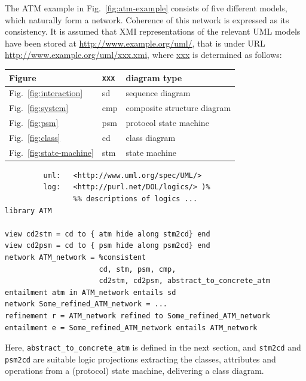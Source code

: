 \documentclass[10pt,fleqn,final]{scrreprt}
\newcommand{\cbs}[0]{\color{red}\xspace} %
\newcommand{\cbe}[0]{\color{black}\xspace} %
\newenvironment{definitions}[0]{\medskip }{}
\begin{document}
\begin{definitions}
The ATM example in Fig.~\ref{fig:atm-example} consists of five different
models, which naturally form a network. Coherence of this network
is expressed as its consistency.\cbs 
It is assumed that XMI representations\cbe of the
relevant UML models have been stored at
\url{http://www.example.org/uml/}, that is under URL
\url{http://www.example.org/uml/xxx.xmi}, where \url{xxx} is
determined as follows:\medskip

\begin{tabular}{|l|l|l|}\hline
\textbf{Figure} & \textbf{\texttt{xxx}} & \textbf{diagram type}\\\hline
Fig.~\ref{fig:interaction} & sd & sequence diagram\\\hline
Fig.~\ref{fig:system} & cmp & composite structure diagram\\\hline
Fig.~\ref{fig:psm} & psm & protocol state machine\\\hline
Fig.~\ref{fig:class} & cd & class diagram\\\hline
Fig.~\ref{fig:state-machine} & stm & state machine\\\hline
\end{tabular}

\begin{lstlisting}[basicstyle=\ttfamily,language=dolText,morekeywords={props,ObjectProperty,Class,DisjointUnionOf,SubClassOf,Characteristics,Transitive,Asymmetric,SubPropertyOf,DisjointClasses,EquivalentTo,inverse,only,forall,iff,if,or,exists,distributed,refinement,library,via,network,entailment,entails,refined,consistent},escapechar=@,mathescape]
%prefix( :      <http://www.example.org/uml/>
         uml:   <http://www.uml.org/spec/UML/>
         log:   <http://purl.net/DOL/logics/> )%
                %% descriptions of logics ...
library ATM

view cd2stm = cd to { atm hide along stm2cd} end
view cd2psm = cd to { psm hide along psm2cd} end
network ATM_network = %consistent
                      cd, stm, psm, cmp,
                      cd2stm, cd2psm, abstract_to_concrete_atm
entailment atm in ATM_network entails sd
network Some_refined_ATM_network = ...
refinement r = ATM_network refined to Some_refined_ATM_network
entailment e = Some_refined_ATM_network entails ATM_network
\end{lstlisting}
Here, \texttt{abstract\_to\_concrete\_atm} is defined in the next
section, and \texttt{stm2cd} and \texttt{psm2cd} are suitable logic
projections extracting the classes, attributes and operations from a
(protocol) state machine, delivering a class diagram.


\end{definitions}
\end{document}
